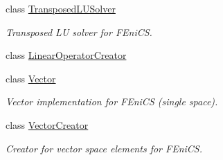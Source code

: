 \begin{DoxyCompactItemize}
class \hyperlink{classSpacy_1_1FEniCS_1_1TransposedLUSolver}{\-Transposed\-L\-U\-Solver}
\begin{DoxyCompactList}\small\item\em \-Transposed \-L\-U solver for \-F\-Eni\-C\-S. \end{DoxyCompactList}\item 
class \hyperlink{classSpacy_1_1FEniCS_1_1LinearOperatorCreator}{\-Linear\-Operator\-Creator}
\item 
class \hyperlink{classSpacy_1_1FEniCS_1_1Vector}{\-Vector}
\begin{DoxyCompactList}\small\item\em \-Vector implementation for \-F\-Eni\-C\-S (single space). \end{DoxyCompactList}\item 
class \hyperlink{classSpacy_1_1FEniCS_1_1VectorCreator}{\-Vector\-Creator}
\begin{DoxyCompactList}\small\item\em \-Creator for vector space elements for \-F\-Eni\-C\-S. \end{DoxyCompactList}\end{DoxyCompactItemize}

